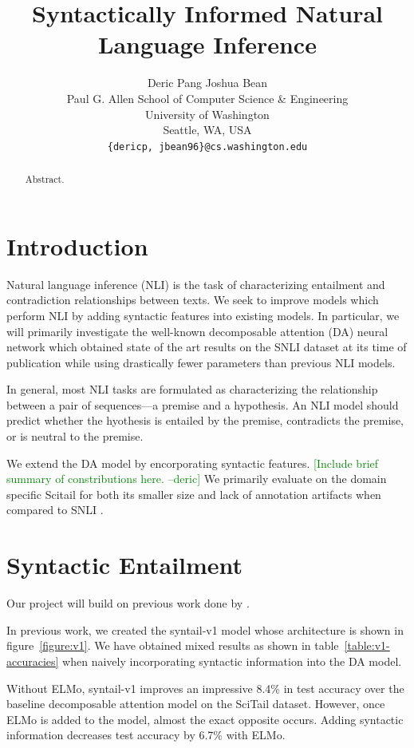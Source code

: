 \documentclass[11pt,a4paper]{article}
\title{Syntactically Informed Natural Language Inference}
\author{
  Deric Pang \quad
  Joshua Bean \\
  Paul G. Allen School of Computer Science \& Engineering \\
  University of Washington \\
  Seattle, WA, USA \\
  {\tt \{dericp, jbean96\}@cs.washington.edu} \\
}
\date{}
\newcommand{\dpcomment}[1]{\textcolor{green}{[#1 --deric]}}
\begin{document}
\maketitle
\begin{abstract}
  Abstract.
\end{abstract}

\section{Introduction}

Natural language inference (NLI) is the task of characterizing entailment and
contradiction relationships between texts. We seek to improve models which
perform NLI by adding syntactic features into existing models. In particular,
we will primarily investigate the well-known decomposable attention (DA) neural
network \citep{Parikh2016-em} which obtained state of the art results on the
SNLI \citep{Bowman2015-is} dataset at its time of publication while using
drastically fewer parameters than previous NLI models.

In general, most NLI tasks are formulated as characterizing the relationship
between a pair of sequences---a premise and a hypothesis. An NLI model should
predict whether the hyothesis is entailed by the premise, contradicts the
premise, or is neutral to the premise.

We extend the DA model by encorporating syntactic features.
\dpcomment{Include brief summary of constributions here.}
We primarily
evaluate on the domain specific Scitail \citep{Khot2018-th} for both its
smaller size and lack of annotation artifacts when compared to SNLI
\citep{Gururangan2018-lj}.

\section{Syntactic Entailment}

Our project will build on previous work done by \citet{Pang2018-syntail}.

In previous work, we created the syntail-v1 model whose architecture is shown
in figure~\ref{figure:v1}.  We have obtained mixed results as shown in
table~\ref{table:v1-accuracies} when naively incorporating syntactic
information into the DA model.

Without ELMo, syntail-v1 improves an impressive 8.4\% in test accuracy over the
baseline decomposable attention model on the SciTail dataset. However, once
ELMo is added to the model, almost the exact opposite occurs. Adding syntactic
information decreases test accuracy by 6.7\% with ELMo.
\end{document}
